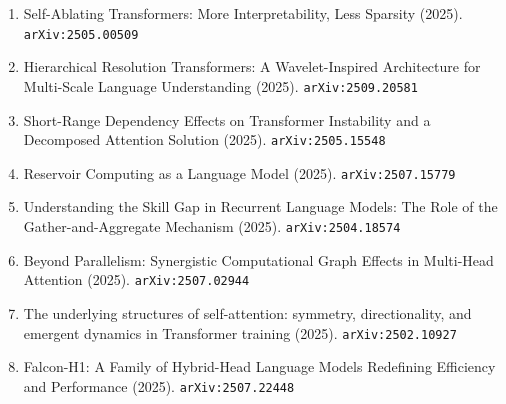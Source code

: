 \documentclass[11pt]{article}
\begin{document}
\begin{enumerate}
  \item Self-Ablating Transformers: More Interpretability, Less Sparsity (2025). \texttt{arXiv:2505.00509}
  \item Hierarchical Resolution Transformers: A Wavelet-Inspired Architecture for Multi-Scale Language Understanding (2025). \texttt{arXiv:2509.20581}
  \item Short-Range Dependency Effects on Transformer Instability and a Decomposed Attention Solution (2025). \texttt{arXiv:2505.15548}
  \item Reservoir Computing as a Language Model (2025). \texttt{arXiv:2507.15779}
  \item Understanding the Skill Gap in Recurrent Language Models: The Role of the Gather-and-Aggregate Mechanism (2025). \texttt{arXiv:2504.18574}
  \item Beyond Parallelism: Synergistic Computational Graph Effects in Multi-Head Attention (2025). \texttt{arXiv:2507.02944}
  \item The underlying structures of self-attention: symmetry, directionality, and emergent dynamics in Transformer training (2025). \texttt{arXiv:2502.10927}
  \item Falcon-H1: A Family of Hybrid-Head Language Models Redefining Efficiency and Performance (2025). \texttt{arXiv:2507.22448}
\end{enumerate}
\end{document}

